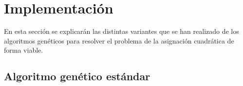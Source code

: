 \section{Implementación}

En esta sección se explicarán las distintas variantes que se han realizado de los algoritmos genéticos para resolver el problema de la asignación cuadrática de forma viable.

\subsection{Algoritmo genético estándar}

